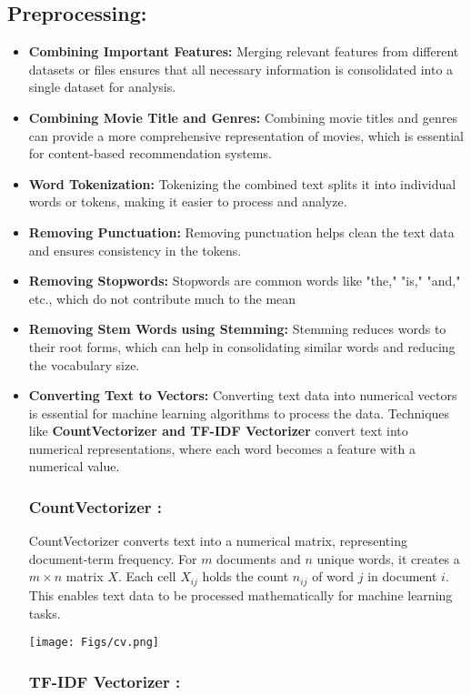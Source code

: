 \documentclass[a4paper]{article}
\theoremstyle{plain}
\theoremstyle{definition}
\begin{document}
\subsection{\Large \color[RGB]{50,50,50} Preprocessing:}
\begin{itemize}
    \item \textbf{Combining Important Features:} Merging relevant features from different datasets or files ensures that all necessary information is consolidated into a single dataset for analysis.
    \item \textbf{Combining Movie Title and Genres:} Combining movie titles and genres can provide a more comprehensive representation of movies, which is essential for content-based recommendation systems.
    \item \textbf{Word Tokenization:} Tokenizing the combined text splits it into individual words or tokens, making it easier to process and analyze.
    \item \textbf{Removing Punctuation:} Removing punctuation helps clean the text data and ensures consistency in the tokens.
    \item \textbf{Removing Stopwords:} Stopwords are common words like "the," "is," "and," etc., which do not contribute much to the mean
    \item \textbf{Removing Stem Words using Stemming:} Stemming reduces words to their root forms, which can help in consolidating similar words and reducing the vocabulary size.
    \item \textbf{Converting Text to Vectors:} Converting text data into numerical vectors is essential for machine learning algorithms to process the data. Techniques like \textbf{CountVectorizer and TF-IDF Vectorizer} convert text into numerical representations, where each word becomes a feature with a numerical value.
    \subsubsection{CountVectorizer : }
    CountVectorizer converts text into a numerical matrix, representing document-term frequency. For \( m \) documents and \( n \) unique words, it creates a \( m \times n \) matrix \( X \). Each cell \( X_{ij} \) holds the count \( n_{ij} \) of word \( j \) in document \( i \). This enables text data to be processed mathematically for machine learning tasks.
    
    \texttt{[image: Figs/cv.png]}

    \subsubsection{TF-IDF Vectorizer : }


\end{itemize}
\end{document}
